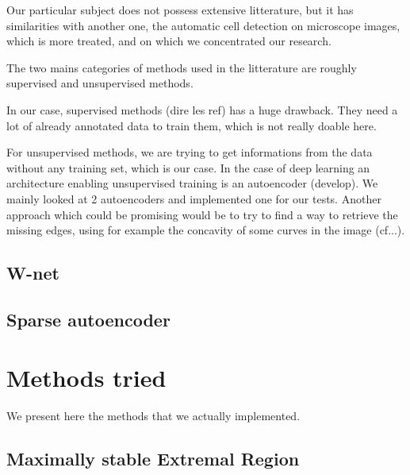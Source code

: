 \documentclass{report}
\begin{document}
Our particular subject does not possess extensive litterature, but it has similarities with another one, the automatic cell detection on microscope images, which is more treated, and on which we concentrated our research.

The two mains categories of methods used in the litterature are roughly supervised and unsupervised methods.  \newline

In our case, supervised methods (dire les ref) has a huge drawback. They need a lot of already annotated data to train them, which is not really doable here.  \newline

For unsupervised methods, we are trying to get informations from the data without any training set, which is our case.
In the case of deep learning an architecture enabling unsupervised training is an autoencoder (develop). We mainly looked at 2 autoencoders and implemented one for our tests.
Another approach which could be promising would be to try to find a way to retrieve the missing edges, using for example the concavity of some curves in the image (cf...).

\section{W-net}

\section{Sparse autoencoder}



\chapter{Methods tried}
We present here the methods that we actually implemented.

\section{Maximally stable Extremal Region}
\end{document}
